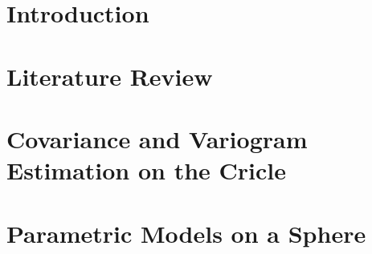 \documentclass[phd]{uncgdissertation}
\begin{document}
\tableofcontents %


\listoftables   


\listoffigures   


\mainmatter %


\chapter{Introduction}


\chapter{Literature Review}



\chapter{Covariance and Variogram Estimation on the Cricle}


\chapter{Parametric Models on a Sphere}


\end{document}
